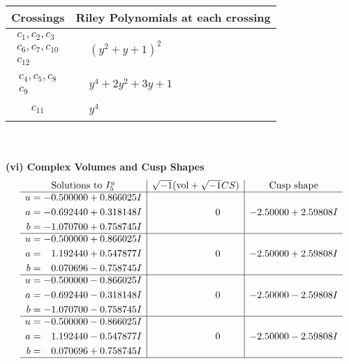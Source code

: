 \documentclass[1p]{elsarticle_modified}
\theoremstyle{definition}
\newcommand{\I}{\sqrt{-1}}
\begin{document}
\begin{tabular}{m{50pt}|m{274pt}}
Crossings & \hspace{64pt}Riley Polynomials at each crossing \\
\hline $$\begin{aligned}c_{1},c_{2},c_{3}\\c_{6},c_{7},c_{10}\\c_{12}\end{aligned}$$&$\begin{aligned}
&(y^2+y+1)^2
\end{aligned}$\\
\hline $$\begin{aligned}c_{4},c_{5},c_{8}\\c_{9}\end{aligned}$$&$\begin{aligned}
&y^4+2 y^2+3 y+1
\end{aligned}$\\
\hline $$\begin{aligned}c_{11}\end{aligned}$$&$\begin{aligned}
&y^4
\end{aligned}$\\
\hline
\end{tabular}\\~\\
\newpage\flushleft \textbf{(vi) Complex Volumes and Cusp Shapes}
$$\begin{array}{c|c|c}  
\text{Solutions to }I^u_{5}& \I (\text{vol} + \sqrt{-1}CS) & \text{Cusp shape}\\
 \hline 
\begin{aligned}
u &= -0.500000 + 0.866025 I \\
a &= -0.692440 + 0.318148 I \\
b &= -1.070700 + 0.758745 I\end{aligned}
 & \phantom{-0.000000 } 0 & -2.50000 + 2.59808 I \\ \hline\begin{aligned}
u &= -0.500000 + 0.866025 I \\
a &= \phantom{-}1.192440 + 0.547877 I \\
b &= \phantom{-}0.070696 - 0.758745 I\end{aligned}
 & \phantom{-0.000000 } 0 & -2.50000 + 2.59808 I \\ \hline\begin{aligned}
u &= -0.500000 - 0.866025 I \\
a &= -0.692440 - 0.318148 I \\
b &= -1.070700 - 0.758745 I\end{aligned}
 & \phantom{-0.000000 } 0 & -2.50000 - 2.59808 I \\ \hline\begin{aligned}
u &= -0.500000 - 0.866025 I \\
a &= \phantom{-}1.192440 - 0.547877 I \\
b &= \phantom{-}0.070696 + 0.758745 I\end{aligned}
 & \phantom{-0.000000 } 0 & -2.50000 - 2.59808 I\\
 \hline 
 \end{array}$$\newpage\newpage\renewcommand{\arraystretch}{1}
\end{document}
